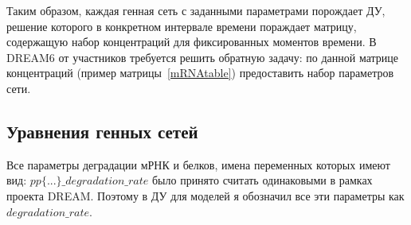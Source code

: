 Таким образом, каждая генная сеть с заданными параметрами порождает ДУ, 
решение которого в конкретном интервале времени пораждает матрицу, 
содержащую набор концентраций для фиксированных моментов времени. В DREAM6 от
участников требуется решить обратную задачу: по данной матрице концентраций 
(пример матрицы~\ref{mRNAtable}) предоставить набор параметров сети.

\clearpage
\subsection{Уравнения генных сетей} \label{s2_3_up}

Все параметры деградации мРНК и белков, имена переменных которых имеют вид: 
$pp\{...\}\_degradation\_rate$ было принято считать одинаковыми в рамках проекта
DREAM. Поэтому в ДУ для моделей я обозначил все эти параметры как 
$degradation\_rate$. 

